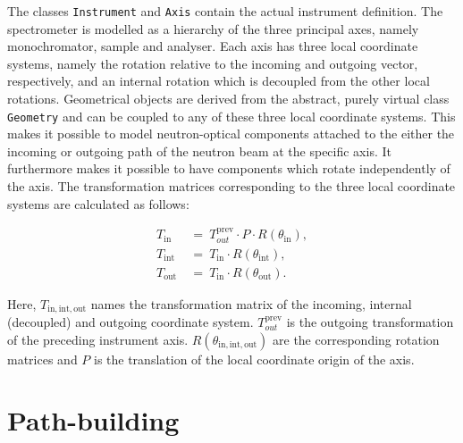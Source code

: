 The classes \lstinline[language=C++]|Instrument| and \lstinline[language=C++]|Axis| contain the actual instrument definition.
The spectrometer is modelled as a hierarchy of the three principal axes, namely monochromator, sample and analyser.
Each axis has three local coordinate systems, namely the rotation relative to the incoming and outgoing vector, respectively,
and an internal rotation which is decoupled from the other local rotations.
Geometrical objects are derived from the abstract, purely virtual class \lstinline[language=C++]|Geometry| and can be
coupled to any of these three local coordinate systems.
This makes it possible to model neutron-optical components attached to the either the incoming or outgoing path of the
neutron beam at the specific axis. It furthermore makes it possible to have components which rotate independently of
the axis.
The transformation matrices corresponding to the three local coordinate systems are calculated as follows:

\begin{equation}
\begin{split}
	T_{\mathrm{in}} & \ =\  T_{out}^{\mathrm{prev}} \cdot P \cdot R\left(\theta_{\mathrm{in}}\right), \\
	T_{\mathrm{int}} & \ =\  T_{\mathrm{in}} \cdot R\left(\theta_{\mathrm{int}}\right), \\
	T_{\mathrm{out}} & \ =\  T_{\mathrm{in}} \cdot R\left(\theta_{\mathrm{out}}\right).
\end{split}
\end{equation}

Here, $T_{\mathrm{in, int, out}}$ names the transformation matrix of the incoming, internal (decoupled) and outgoing
coordinate system. $T_{out}^{\mathrm{prev}}$ is the outgoing transformation of the preceding instrument axis.
$R\left(\theta_{\mathrm{in, int, out}}\right)$ are the corresponding rotation matrices and $P$ is the translation
of the local coordinate origin of the axis.






\section{Path-building}
\label{sec:buildpath}

